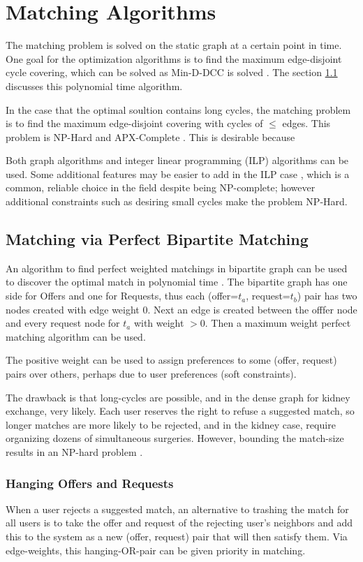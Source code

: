 \documentclass[main.tex]{subfiles}
\begin{document}
\section{Matching Algorithms}
The matching problem is solved on the static graph at a certain point in time. One goal for the optimization algorithms is to find the maximum edge-disjoint cycle covering, which can be solved as Min-D-DCC is solved \cite{Man1} \cite{Bir}. The section \ref{bima} discusses this polynomial time algorithm.

In the case that the optimal soultion contains long cycles, the matching problem is to find the maximum edge-disjoint covering with cycles of $\leq$ edges. This problem is NP-Hard and APX-Complete \cite{Bir}. This is desirable because

Both graph algorithms and integer linear programming (ILP) algorithms can be used. Some additional features may be easier to add in the ILP case , which is a common, reliable choice in the field despite being NP-complete; however additional constraints such as desiring small cycles make the problem NP-Hard.

\subsection{Matching via Perfect Bipartite Matching}\label{bima}

An algorithm to find perfect weighted matchings in bipartite graph can be used to discover the optimal match in polynomial time \cite{Bir}. The bipartite graph has one side for Offers and one for Requests, thus each (offer=$t_a$, request=$t_b$) pair has two nodes created with edge weight $0$. Next an edge is created between the offfer node and every request node for $t_a$ with weight $> 0$. Then a maximum weight perfect matching algorithm can be used.

The positive weight can be used to assign preferences to some (offer, request) pairs over others, perhaps due to user preferences (soft constraints).

The drawback is that long-cycles are possible, and in the dense graph for kidney exchange, very likely. Each user reserves the right to refuse a suggested match, so longer matches are more likely to be rejected, and in the kidney case, require organizing dozens of simultaneous surgeries. However, bounding the match-size results in an NP-hard problem \cite{Bir}.

\subsubsection{Hanging Offers and Requests}
When a user rejects a suggested match, an alternative to trashing the match for all users is to take the offer and request of the rejecting user's neighbors and add this to the system as a new (offer, request) pair that will then satisfy them. Via edge-weights, this hanging-OR-pair can be given priority in matching.
\end{document}
